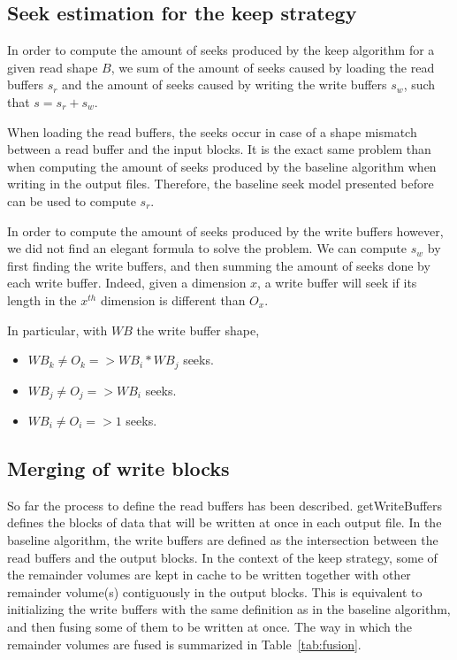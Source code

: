 \documentclass[sigconf, nonacm]{acmart}
\begin{document}
\subsection{Seek estimation for the keep strategy}
In order to compute the amount of seeks produced by the keep algorithm
for a given read shape $B$, we sum of the amount of seeks caused by loading the
read buffers $s_r$ and the amount of seeks caused by writing the write
buffers $s_w$, such that $s=s_r+s_w$.

When loading the read buffers, the seeks occur in case of a shape mismatch
between a read buffer and the input blocks. It is the exact same problem than
when computing the amount of seeks produced by the baseline algorithm when
writing in the output files. Therefore, the baseline seek model presented
before can be used to compute $s_r$.

In order to compute the amount of seeks produced by the write buffers however,
we did not find an elegant formula to solve the problem. We can compute $s_w$
by first finding the write buffers, and then summing the amount of seeks done
by each write buffer. Indeed, given a dimension $x$, a write buffer will seek
if its length in the $x^{th}$ dimension is different than $O_x$.

In particular, with $WB$ the write buffer shape,
\begin{itemize}
  \item $WB_k \neq O_k => WB_i*WB_j$ seeks.
  \item $WB_j \neq O_j => WB_i$ seeks.
  \item $WB_i \neq O_i => 1$ seeks.
\end{itemize}

\subsection{Merging of write blocks}
So far the process to define the read buffers has been described.
getWriteBuffers defines the blocks of data that will be written at once in each
output file.
In the baseline algorithm, the write buffers are defined as the
intersection between the read buffers and the output blocks.
In the context of the keep strategy, some of the remainder volumes are kept in cache
to be written together with other remainder volume(s) contiguously in the output
blocks.
This is equivalent to initializing the write buffers with the same definition as
in the baseline algorithm, and then fusing some of them to be written at once.
The way in which the remainder volumes are fused is summarized in
Table~\ref{tab:fusion}.
\end{document}

